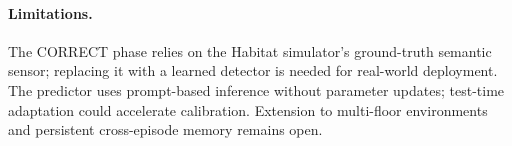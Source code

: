 \documentclass[10pt,twocolumn,letterpaper]{article}
\begin{document}
\paragraph{Limitations.} The CORRECT phase relies on the Habitat simulator's ground-truth semantic sensor; replacing it with a learned detector is needed for real-world deployment. The predictor uses prompt-based inference without parameter updates; test-time adaptation could accelerate calibration. Extension to multi-floor environments and persistent cross-episode memory remains open.

{\small


}
\end{document}
